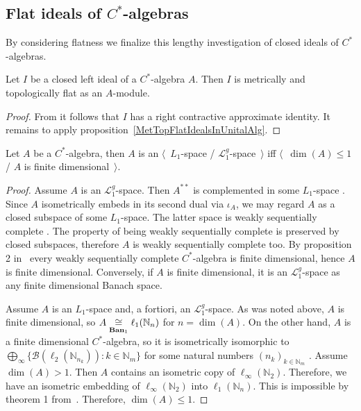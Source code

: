 
\subsection{
    Flat ideals of \texorpdfstring{$C^*$}{C*}-algebras}\label{
SubSectionFlatIdealsOfCStarAlgebras}

By considering flatness we finalize this lengthy investigation of closed ideals of
$C^*$-algebras.

\begin{proposition}\label{IdealofCstarAlgisMetTopFlat} Let $I$ be a closed left ideal
of a $C^*$-algebra $A$. Then $I$ is metrically and topologically flat as an
$A$-module.
\end{proposition}
\begin{proof} From \cite[proposition 4.7.78]{HelBanLocConvAlg} it follows that
$I$ has a right contractive approximate identity. It remains to apply
proposition~\ref{MetTopFlatIdealsInUnitalAlg}.
\end{proof}

\begin{proposition}\label{CStarAlgIsL1IfFinDim} Let $A$ be a $C^*$-algebra, then
$A$ is an $\langle$~$L_1$-space / $\mathscr{L}_1^g$-space~$\rangle$ iff
$\langle$~$\operatorname{dim}(A)\leq 1$ / $A$ is finite dimensional~$\rangle$.
\end{proposition}
\begin{proof} Assume $A$ is an $\mathscr{L}_1^g$-space. Then $A^{**}$ is
complemented in some $L_1$-space \cite[corollary 23.2.1(2)]{DefFloTensNorOpId}. Since $A$ isometrically embeds in its second dual via $\iota_{A}$, we
may regard $A$ as a closed subspace of some $L_1$-space. The latter space is
weakly sequentially complete \cite[corollary III.C.14]{WojBanSpForAnalysts}.
The property of being weakly sequentially complete is preserved by closed
subspaces, therefore $A$ is weakly sequentially complete too. By proposition 2
in~\cite{SakWeakCompOpOnOpAlg} every weakly sequentially complete $C^*$-algebra
is finite dimensional, hence $A$ is finite dimensional. Conversely, if $A$ is
finite dimensional, it is an $\mathscr{L}_1^g$-space as any finite dimensional
Banach space.

Assume $A$ is an $L_1$-space and, a fortiori, an $\mathscr{L}_1^g$-space. As was
noted above, $A$ is finite dimensional, so
$A\mathrel{\mathop{\cong}\limits_{\mathbf{Ban}_1}}\ell_1(\mathbb{N}_n)$ for $n=\operatorname{dim}(A)$. On
the other hand, $A$ is a finite dimensional $C^*$-algebra, so it is
isometrically isomorphic to $\bigoplus_\infty \{
\mathcal{B}(\ell_2(\mathbb{N}_{n_k})):k\in\mathbb{N}_m \}$ for some natural
numbers ${(n_k)}_{k\in\mathbb{N}_m}$ 
\cite[theorem III.1.1]{DavCSatrAlgByExmpl}.
Assume $\operatorname{dim}(A)>1$. Then $A$ contains an isometric copy of
$\ell_\infty(\mathbb{N}_2)$. Therefore, we have an isometric embedding of
$\ell_\infty(\mathbb{N}_2)$ into $\ell_1(\mathbb{N}_n)$. This is impossible by
theorem 1 from~\cite{LyubIsomEmdbFinDimLp}. 
Therefore, $\operatorname{dim}(A)\leq 1$. 
\end{proof}

